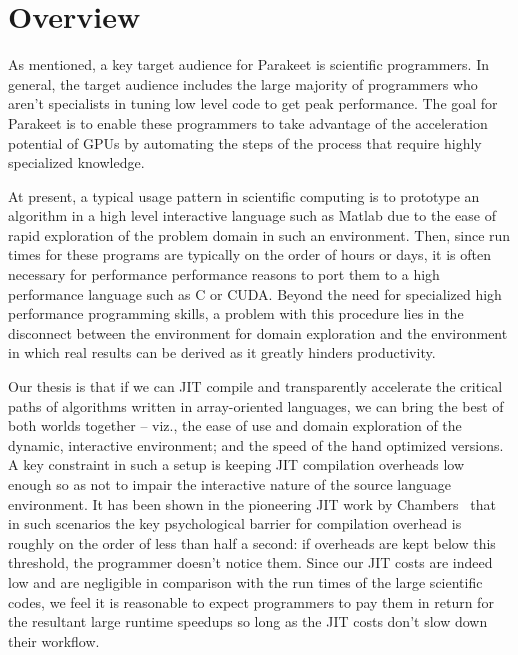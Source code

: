 \documentclass[preprint]{sigplanconf}
\begin{document}
\section{Overview}
\label{overview}

As mentioned, a key target audience for Parakeet is scientific programmers. In general, the target audience includes the large majority of programmers who aren't specialists in tuning low level code to get peak performance.  The goal for Parakeet is to enable these programmers to take advantage of the acceleration potential of GPUs by automating the steps of the process that require highly specialized knowledge.

At present, a typical usage pattern in scientific computing is to prototype an algorithm in a high level interactive language such as Matlab due to the ease of rapid exploration of the problem domain in such an environment.  Then, since run times for these programs are typically on the order of hours or days, it is often necessary for performance performance reasons to port them to a high performance language such as C or CUDA.  Beyond the need for specialized high performance programming skills, a problem with this procedure  lies in the disconnect between the environment for domain exploration and the environment in which real results can be derived as it greatly hinders productivity.

Our thesis is that if we can JIT compile and transparently accelerate the critical paths of algorithms written in array-oriented languages, we can bring the best of both worlds together -- viz., the ease of use and domain exploration of the dynamic, interactive environment; and the speed of the hand optimized versions. A key constraint in such a setup is keeping JIT compilation overheads low enough so as not to impair the interactive nature of the source language environment.  It has been shown in the pioneering JIT work by Chambers~\cite{Cham92} that in such scenarios the key psychological barrier for compilation overhead is roughly on the order of less than half a second: if overheads are kept below this threshold, the programmer doesn't notice them.  Since our JIT costs are indeed low and are negligible in comparison with the run times of the large scientific codes, we feel it is reasonable to expect programmers to pay them in return for the resultant large runtime speedups so long as the JIT costs don't slow down their workflow.
\end{document}
